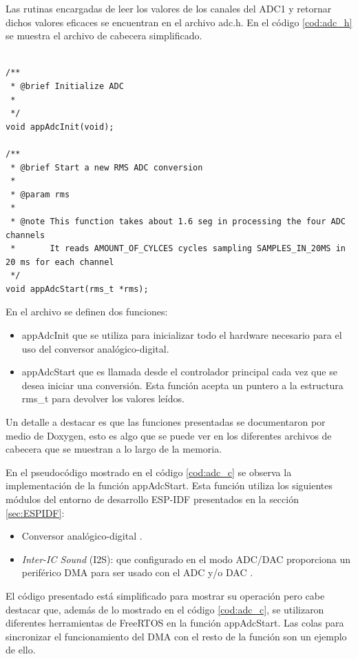 Las rutinas encargadas de leer los valores de los canales del ADC1 y retornar dichos valores eficaces se encuentran en el archivo adc.h. En el código \ref{cod:adc_h} se muestra el archivo de cabecera simplificado. 

\begin{lstlisting}[label=cod:adc_h,caption=Pseudocódigo del módulo adc.h.] % Start your code-block

/**
 * @brief Initialize ADC 
 * 
 */
void appAdcInit(void);

/**
 * @brief Start a new RMS ADC conversion
 * 
 * @param rms
 *
 * @note This function takes about 1.6 seg in processing the four ADC channels
 *       It reads AMOUNT_OF_CYLCES cycles sampling SAMPLES_IN_20MS in 20 ms for each channel
 */
void appAdcStart(rms_t *rms);

\end{lstlisting}

En el archivo se definen dos funciones:
\begin{itemize}
\item appAdcInit que se utiliza para inicializar todo el hardware necesario para el uso del conversor analógico-digital.
\item appAdcStart que es llamada desde el controlador principal cada vez que se desea iniciar una conversión. Esta función acepta un puntero a la estructura rms\_t para devolver los valores leídos. 
\end{itemize}

Un detalle a destacar es que las funciones presentadas se documentaron por medio de Doxygen, esto es algo que se puede ver en los diferentes archivos de cabecera que se muestran a lo largo de la memoria.

En el pseudocódigo mostrado en el código \ref{cod:adc_c} se observa la implementación de la función appAdcStart. Esta función utiliza los siguientes módulos del entorno de desarrollo ESP-IDF presentados en la sección \ref{sec:ESPIDF}: 
\begin{itemize}
\item Conversor analógico-digital \citep{ADC}.
\item \textit{Inter-IC Sound} (I2S): que configurado en el modo ADC/DAC proporciona un periférico DMA para ser usado con el ADC y/o DAC \citep{I2S}.
\end{itemize}

El código presentado está simplificado para mostrar su operación pero cabe destacar que, además de lo mostrado en el código \ref{cod:adc_c}, se utilizaron diferentes herramientas de FreeRTOS en la función appAdcStart. Las colas para sincronizar el funcionamiento del DMA con el resto de la función son un ejemplo de ello.


